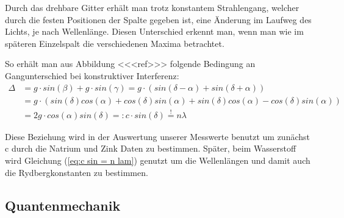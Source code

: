 \documentclass[]{article}
\begin{document}
Durch das drehbare Gitter erhält man trotz konstantem Strahlengang, welcher durch die festen Positionen der Spalte gegeben ist, eine Änderung im Laufweg des Lichts, je nach Wellenlänge. Diesen Unterschied erkennt man, wenn man wie im späteren Einzelspalt die verschiedenen Maxima betrachtet. 

So erhält man aus Abbildung <<<ref>>> folgende Bedingung an Gangunterschied bei konstruktiver Interferenz:
\begin{align}
\Delta &= g\cdot sin(\beta) + g\cdot sin(\gamma) = g\cdot \left( sin(\delta - \alpha) + sin(\delta + \alpha)  \right) \\
 &= g\cdot ( sin(\delta)cos(\alpha) + cos(\delta)sin(\alpha) +  sin(\delta)cos(\alpha) - cos(\delta)sin(\alpha) ) \\
 &= 2g \cdot cos(\alpha) sin(\delta) =: c \cdot sin(\delta) \stackrel{!}{=} n\lambda \label{eq:c sin = n lam}
\end{align}

Diese Beziehung wird in der Auswertung unserer Messwerte benutzt um zunächst c durch die Natrium und Zink Daten zu bestimmen. Später, beim Wasserstoff wird Gleichung (\ref{eq:c sin = n lam}) genutzt um die Wellenlängen und damit auch die Rydbergkonstanten zu bestimmen.

\subsection{Quantenmechanik}
\end{document}
